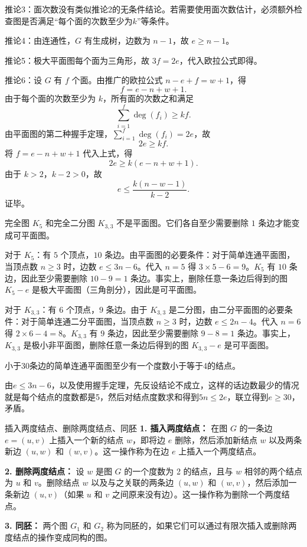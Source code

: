 \documentclass[lang=cn,11pt]{elegantbook}
\begin{document}
推论3：面次数没有类似推论2的无条件结论。若需要使用面次数估计，必须额外检查图是否满足“每个面的次数至少为$k$”等条件。

推论4：由连通性，$G$ 有生成树，边数为 $n-1$，故 $e \geqslant n-1$。

推论5：极大平面图每个面为三角形，故 $3f=2e$，代入欧拉公式即得。

推论6：设 $G$ 有 $f$ 个面。由推广的欧拉公式 $n - e + f = w + 1$，得
    \[
    f = e - n + w + 1.
    \]
    由于每个面的次数至少为 $k$，所有面的次数之和满足
    \[
    \sum_{i=1}^{f} \deg(f_i) \ge k f.
    \]
    由平面图的第二种握手定理，$\sum_{i=1}^{f} \deg(f_i) = 2e$，故
    \[
    2e \ge k f.
    \]
    将 $f = e - n + w + 1$ 代入上式，得
    \[
    2e \ge k (e - n + w + 1).
    \]
    由于 $k>2$，$k-2 > 0$，故
    \[
    e \le \frac{k(n - w - 1)}{k-2}.
    \]
    证毕。
\begin{example}
    完全图 $K_5$ 和完全二分图 $K_{3,3}$ 不是平面图。它们各自至少需要删除 $1$ 条边才能变成可平面图。
\end{example}
对于 $K_5$：有 $5$ 个顶点，$10$ 条边。由平面图的必要条件：对于简单连通平面图，当顶点数 $n \geqslant 3$ 时，边数 $e \leqslant 3n-6$。代入 $n=5$ 得 $3 \times 5 - 6 = 9$。$K_5$ 有 $10$ 条边，因此至少需要删除 $10-9=1$ 条边。事实上，删除任意一条边后得到的图 $K_5 - e$ 是极大平面图（三角剖分），因此是可平面图。

对于 $K_{3,3}$：有 $6$ 个顶点，$9$ 条边。由于 $K_{3,3}$ 是二分图，由二分平面图的必要条件：对于简单连通二分平面图，当顶点数 $n \geqslant 3$ 时，边数 $e \leqslant 2n-4$。代入 $n=6$ 得 $2 \times 6 - 4 = 8$。$K_{3,3}$ 有 $9$ 条边，因此至少需要删除 $9-8=1$ 条边。事实上，$K_{3,3}$ 是极小非平面图，删除任意一条边后得到的图 $K_{3,3} - e$ 是可平面图。

\begin{example}
    小于30条边的简单连通平面图至少有一个度数小于等于4的结点。
\end{example}
由$e\leqslant 3n-6$，以及使用握手定理，先反设结论不成立，这样的话边数最少的情况就是每个结点的度数都是5，然后对结点度数求和得到$5n\leqslant 2e$，联立得到$e\geqslant 30$，矛盾。

\begin{definition}{插入两度结点、删除两度结点、同胚}
\textbf{1. 插入两度结点：}
在图 $G$ 的一条边 $e = (u, v)$ 上插入一个新的结点 $w$，即将边 $e$ 删除，然后添加新结点 $w$ 以及两条新边 $(u, w)$ 和 $(w, v)$。这一操作称为在边 $e$ 上插入一个两度结点。

\textbf{2. 删除两度结点：}
设 $w$ 是图 $G$ 的一个度数为 2 的结点，且与 $w$ 相邻的两个结点为 $u$ 和 $v$。删除结点 $w$ 以及与之关联的两条边 $(u, w)$ 和 $(w, v)$，然后添加一条新边 $(u, v)$（如果 $u$ 和 $v$ 之间原来没有边）。这一操作称为删除一个两度结点。

\textbf{3. 同胚：}
两个图 $G_1$ 和 $G_2$ 称为同胚的，如果它们可以通过有限次插入或删除两度结点的操作变成同构的图。
\end{definition}
\end{document}
